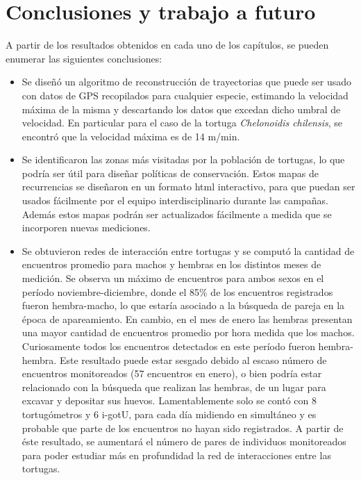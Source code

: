 \chapter{Conclusiones y trabajo a futuro}
A partir de los resultados obtenidos en cada uno de los capítulos,
se pueden enumerar las siguientes conclusiones:
 
\begin{itemize}
 
\item Se diseñó un algoritmo de reconstrucción de trayectorias que puede ser usado con datos de GPS recopilados para cualquier especie, estimando la velocidad máxima de la misma y descartando los datos que excedan dicho umbral de velocidad. En particular para el caso de la tortuga \textit{Chelonoidis chilensis}, se encontró que la velocidad máxima es de 14 m/min.
 
\item Se identificaron las zonas más visitadas por la población de tortugas, lo que podría ser útil para diseñar políticas de conservación. Estos mapas de recurrencias se diseñaron en un formato html interactivo, para que puedan ser usados fácilmente por el equipo interdisciplinario durante las campañas. Además estos mapas podrán ser actualizados fácilmente a medida que se incorporen nuevas mediciones.
 
\item Se obtuvieron redes de interacción entre tortugas y se computó
la cantidad de encuentros promedio para machos y hembras
en los distintos meses de medición. Se observa un máximo de encuentros
para
ambos sexos en el período noviembre-diciembre, donde el 85\% de los
encuentros registrados
fueron hembra-macho, lo que estaría asociado a la búsqueda
de pareja en la época de apareamiento. En cambio, en el mes de enero las
hembras presentan una mayor cantidad de encuentros promedio
por hora medida que los machos. Curiosamente todos los encuentros detectados
en este período fueron hembra-hembra. Este resultado puede estar sesgado debido
al escaso número de encuentros monitoreados (57 encuentros en enero), o bien podría
estar relacionado con
la búsqueda que realizan las hembras, de un lugar para excavar y depositar sus
huevos.
Lamentablemente solo se contó con 8 tortugómetros y 6 i-gotU, para cada
día midiendo en simultáneo y es probable que parte de los
encuentros no hayan sido registrados. A partir de éste resultado,
se aumentará el número de pares de individuos
monitoreados para poder estudiar más en profundidad la red de interacciones
entre las tortugas.
 

\end{itemize}
